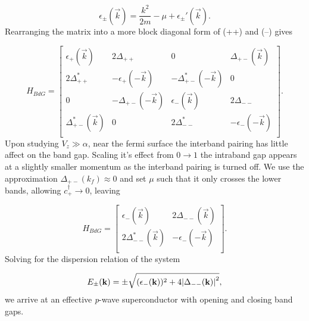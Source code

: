 \begin{equation}
  \epsilon_{\pm}(\vec{k}) = \dfrac{k^2}{2m} - \mu + \epsilon_{\pm}'(\vec{k}).
\end{equation}
Rearranging the matrix into a more block diagonal form of (++) and (--) gives

\begin{equation}
  H_{BdG} =
  \begin{bmatrix}
    \epsilon_+(\vec{k}) & 2\Delta_{++} & 0 & \Delta_{+-}(\vec{k}) \\
    2\Delta_{++}^* & -\epsilon_+(-\vec{k}) & -\Delta_{+-}^*(-\vec{k}) & 0 \\
    0 & -\Delta_{+-}(-\vec{k}) & \epsilon_-(\vec{k}) & 2\Delta_{--} \\
    \Delta_{+-}^*(\vec{k}) & 0 & 2\Delta_{--}^* & -\epsilon_-(-\vec{k}) \\
  \end{bmatrix}.
\end{equation}
Upon studying $V_z \gg \alpha$, near the fermi surface the interband pairing has little affect on the band gap.
Scaling it's effect from $0 \to 1$ the intraband gap appears at a slightly smaller momentum as the interband pairing is turned off.
We use the approximation $\Delta_{+-}(k_f) \approx 0$ and set $\mu$ such that it only crosses the lower bands, allowing $c_+^{\dagger} \to 0$, leaving

\begin{equation}
  H_{BdG} =
  \begin{bmatrix}
    \epsilon_-(\vec{k}) & 2\Delta_{--}(\vec{k}) \\
    2\Delta_{--}^*(\vec{k}) & -\epsilon_-(-\vec{k}) \\
  \end{bmatrix}.
\end{equation}
Solving for the dispersion relation of the system

\begin{align}
  E_{\pm}(\mathbf{k}) = \pm \sqrt{(\epsilon_-(\mathbf{k}))^2+4\abs{\Delta_{--}(\mathbf{k})}^2},
\end{align}
 we arrive at an effective \textit{p}-wave superconductor with opening and closing band gaps.
